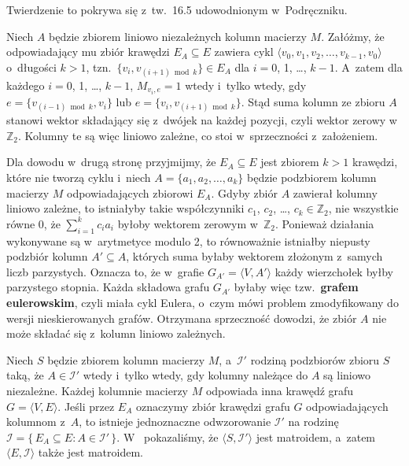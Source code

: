
\subproblem %
Twierdzenie to pokrywa się z~tw.\ 16.5 udowodnionym w~Podręczniku.

\subproblem %

\noindent Niech $A$ będzie zbiorem liniowo niezależnych kolumn macierzy $M$.
Załóżmy, że odpowiadający mu zbiór krawędzi $E_A\subseteq E$ zawiera cykl $\langle v_0,v_1,v_2,\dots,v_{k-1},v_0\rangle$ o~długości $k>1$, tzn.\ $\{v_i,v_{(i+1)\bmod k}\}\in E_A$ dla $i=0$, 1, \dots, $k-1$.
A~zatem dla każdego $i=0$, 1, \dots, $k-1$, $M_{v_i,e}=1$ wtedy i~tylko wtedy, gdy $e=\bigl\{v_{(i-1)\bmod k},v_i\bigr\}$ lub $e=\bigl\{v_i,v_{(i+1)\bmod k}\bigr\}$.
Stąd suma kolumn ze zbioru $A$ stanowi wektor składający się z~dwójek na każdej pozycji, czyli wektor zerowy w~$\mathbb{Z}_2$.
Kolumny te są więc liniowo zależne, co stoi w~sprzeczności z~założeniem.

Dla dowodu w~drugą stronę przyjmijmy, że $E_A\subseteq E$ jest zbiorem $k>1$ krawędzi, które nie tworzą cyklu i~niech $A=\{a_1,a_2,\dots,a_k\}$ będzie podzbiorem kolumn macierzy $M$ odpowiadających zbiorowi $E_A$.
Gdyby zbiór $A$ zawierał kolumny liniowo zależne, to istniałyby takie współczynniki $c_1$, $c_2$, \dots, $c_k\in\mathbb{Z}_2$, nie wszystkie równe 0, że $\sum_{i=1}^kc_ia_i$ byłoby wektorem zerowym w~$\mathbb{Z}_2$.
Ponieważ działania wykonywane są w~arytmetyce modulo 2, to równoważnie istniałby niepusty podzbiór kolumn $A'\subseteq A$, których suma byłaby wektorem złożonym z~samych liczb parzystych.
Oznacza to, że w~grafie $G_{A'}=\langle V,A'\rangle$ każdy wierzchołek byłby parzystego stopnia.
Każda składowa grafu $G_{A'}$ byłaby więc tzw.\ \textbf{grafem eulerowskim}, czyli miała cykl Eulera, o~czym mówi problem  zmodyfikowany do wersji nieskierowanych grafów.
Otrzymana sprzeczność dowodzi, że zbiór $A$ nie może składać się z~kolumn liniowo zależnych.

Niech $S$ będzie zbiorem kolumn macierzy $M$, a~$\mathcal{I}'$ rodziną podzbiorów zbioru $S$ taką, że $A\in\mathcal{I}'$ wtedy i~tylko wtedy, gdy kolumny należące do $A$ są liniowo niezależne.
Każdej kolumnie macierzy $M$ odpowiada inna krawędź grafu $G=\langle V,E\rangle$.
Jeśli przez $E_A$ oznaczymy zbiór krawędzi grafu $G$ odpowiadających kolumnom z~$A$, to istnieje jednoznaczne odwzorowanie $\mathcal{I}'$ na rodzinę $\mathcal{I}=\{\,E_A\subseteq E:A\in\mathcal{I}'\,\}$.
W~ pokazaliśmy, że $\langle S,\mathcal{I}'\rangle$ jest matroidem, a~zatem $\langle E,\mathcal{I}\rangle$ także jest matroidem.

